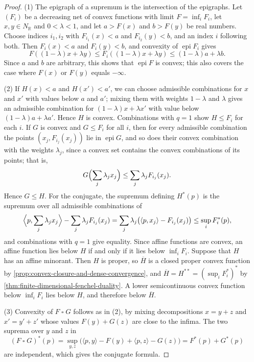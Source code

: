 \begin{proof}
(1) The epigraph of a supremum is the intersection of the epigraphs. Let $(F_i)$ be a decreasing net of convex functions with limit $F=\inf_iF_i$, let $x,y\in N_{\mathbb R}$ and $0<\lambda<1$, and let $a>F(x)$ and $b>F(y)$ be real numbers. Choose indices $i_1,i_2$ with $F_{i_1}(x)<a$ and $F_{i_2}(y)<b$, and an index $i$ following both. Then $F_i(x)<a$ and $F_i(y)<b$, and convexity of $\operatorname{epi}F_i$ gives
\[
 F((1-\lambda)x+\lambda y)\leq F_i((1-\lambda)x+\lambda y)\leq(1-\lambda)a+\lambda b.
\]
Since $a$ and $b$ are arbitrary, this shows that $\operatorname{epi}F$ is convex; this also covers the case where $F(x)$ or $F(y)$ equals $-\infty$.

(2) If $H(x)<a$ and $H(x')<a'$, we can choose admissible combinations for $x$ and $x'$ with values below $a$ and $a'$; mixing them with weights $1-\lambda$ and $\lambda$ gives an admissible combination for $(1-\lambda)x+\lambda x'$ with value below $(1-\lambda)a+\lambda a'$. Hence $H$ is convex. Combinations with $q=1$ show $H\leq F_i$ for each $i$. If $G$ is convex and $G\leq F_i$ for all $i$, then for every admissible combination the points $(x_j,F_{i_j}(x_j))$ lie in $\operatorname{epi}G$, and so does their convex combination with the weights $\lambda_j$, since a convex set contains the convex combinations of its points; that is,
\[
 G\Bigl(\sum_j\lambda_jx_j\Bigr)\leq\sum_j\lambda_jF_{i_j}(x_j).
\]
Hence $G\leq H$. For the conjugate, the supremum defining $H^*(p)$ is the supremum over all admissible combinations of
\[
 \Bigl\langle p,\sum_j\lambda_jx_j\Bigr\rangle-\sum_j\lambda_jF_{i_j}(x_j)=\sum_j\lambda_j\bigl(\langle p,x_j\rangle-F_{i_j}(x_j)\bigr)\leq\sup_iF_i^*(p),
\]
and combinations with $q=1$ give equality. Since affine functions are convex, an affine function lies below $H$ if and only if it lies below $\inf_iF_i$. Suppose that $H$ has an affine minorant. Then $H$ is proper, so $\overline H$ is a closed proper convex function by \cref{prop:convex-closure-and-dense-convergence}, and $\overline H=H^{**}=(\sup_iF_i^*)^*$ by \cref{thm:finite-dimensional-fenchel-duality}. A lower semicontinuous convex function below $\inf_iF_i$ lies below $H$, and therefore below $\overline H$.

(3) Convexity of $F\mathbin\square G$ follows as in (2), by mixing decompositions $x=y+z$ and $x'=y'+z'$ whose values $F(y)+G(z)$ are close to the infima. The two suprema over $y$ and $z$ in
\[
 (F\mathbin\square G)^*(p)=\sup_{y,z}\bigl(\langle p,y\rangle-F(y)+\langle p,z\rangle-G(z)\bigr)=F^*(p)+G^*(p)
\]
are independent, which gives the conjugate formula.


\end{proof}
